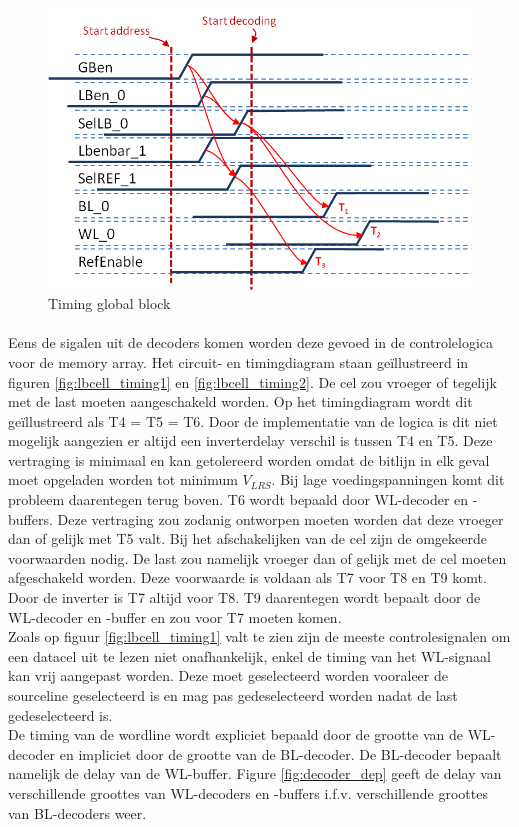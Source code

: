 \begin{figure}[!ht]
  \centering
  \includegraphics[scale=0.9]{../fig/hfdstk-timing-gb2.png}
  \caption[Global block:timing]{Timing global block}
  \label{fig:gb_timing2}
\end{figure}

\paragraph{}
Eens de sigalen uit de decoders komen worden deze gevoed in de controlelogica voor de memory array. Het circuit- en timingdiagram staan geïllustreerd in figuren \ref{fig:lbcell_timing1} en \ref{fig:lbcell_timing2}. De cel zou vroeger of tegelijk met de last moeten aangeschakeld worden. Op het timingdiagram wordt dit geïllustreerd als T4 = T5 = T6. Door de implementatie van de logica is dit niet mogelijk aangezien er altijd een inverterdelay verschil is tussen T4 en T5. Deze vertraging is minimaal en kan getolereerd worden omdat de bitlijn in elk geval moet opgeladen worden tot minimum $V_{LRS}$. Bij lage voedingspanningen komt dit probleem daarentegen terug boven. T6 wordt bepaald door WL-decoder en -buffers. Deze vertraging zou zodanig ontworpen moeten worden dat deze vroeger dan of gelijk met T5 valt. Bij het afschakelijken van de cel zijn de omgekeerde voorwaarden nodig. De last zou namelijk vroeger dan of gelijk met de cel moeten afgeschakeld worden. Deze voorwaarde is voldaan als T7 voor T8 en T9 komt. Door de inverter is T7 altijd voor T8. T9 daarentegen wordt bepaalt door de WL-decoder en -buffer en zou voor T7 moeten komen. \\
Zoals op figuur \ref{fig:lbcell_timing1} valt te zien zijn de meeste controlesignalen om een datacel uit te lezen niet onafhankelijk, enkel de timing van het WL-signaal kan vrij aangepast worden. Deze moet geselecteerd worden vooraleer de sourceline geselecteerd is en mag pas gedeselecteerd worden nadat de last gedeselecteerd is. \\
De timing van de wordline wordt expliciet bepaald door de grootte van de WL-decoder en impliciet door de grootte van de BL-decoder. De BL-decoder bepaalt namelijk de delay van de WL-buffer. Figure \ref{fig:decoder_dep} geeft de delay van verschillende groottes van WL-decoders en -buffers i.f.v. verschillende groottes van BL-decoders weer.

